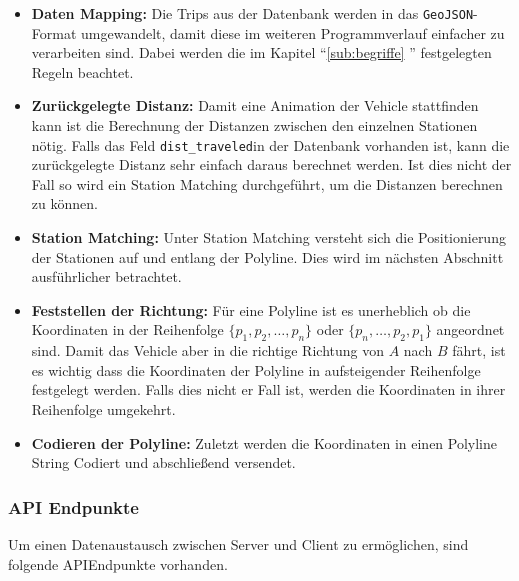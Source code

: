   \begin{itemize}
    \item \textbf{Daten Mapping:} Die Trips aus der Datenbank werden in das \texttt{GeoJSON}-Format umgewandelt, damit diese im weiteren Programmverlauf einfacher zu verarbeiten sind. Dabei werden die im Kapitel "`\ref{sub:begriffe} "' festgelegten Regeln beachtet.

    \item \textbf{Zurückgelegte Distanz:} Damit eine Animation der Vehicle stattfinden kann ist die Berechnung der Distanzen zwischen den einzelnen Stationen nötig. Falls das Feld \texttt{dist\_traveled}\footnotemark in der Datenbank vorhanden ist, kann die zurückgelegte Distanz sehr einfach daraus berechnet werden. Ist dies nicht der Fall so wird ein Station Matching durchgeführt, um die Distanzen berechnen zu können.

    \item \textbf{Station Matching:} Unter Station Matching versteht sich die Positionierung der Stationen auf und entlang der Polyline. Dies wird im nächsten Abschnitt ausführlicher betrachtet.

    \item \textbf{Feststellen der Richtung:} Für eine Polyline ist es unerheblich ob die Koordinaten in der Reihenfolge $\{ p_1, p_2, \dotsc, p_n \}$ oder $\{ p_n, \dotsc, p_2, p_1 \}$ angeordnet sind. Damit das Vehicle aber in die richtige Richtung von $A$ nach $B$ fährt, ist es wichtig dass die Koordinaten der Polyline in aufsteigender Reihenfolge festgelegt werden. Falls dies nicht er Fall ist, werden die Koordinaten in ihrer Reihenfolge umgekehrt.

    \item \textbf{Codieren der Polyline:} Zuletzt werden die Koordinaten in einen Polyline String Codiert und abschließend versendet.
  \end{itemize}

  \subsubsection{API Endpunkte}
  \label{ssub:api_endpunkte}
    Um einen Datenaustausch zwischen Server und Client zu ermöglichen, sind folgende API\footnotemark Endpunkte vorhanden. 


